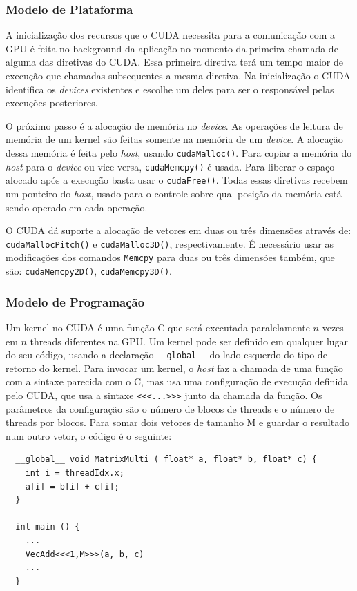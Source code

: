 \subsubsection{Modelo de Plataforma}
A inicialização dos recursos que o CUDA necessita para a comunicação com a GPU é feita no background da
aplicação no momento da primeira chamada de alguma das diretivas do CUDA. Essa primeira diretiva terá um
tempo maior de execução que chamadas subsequentes a mesma diretiva. Na inicialização o CUDA identifica
os \textit{devices} existentes e escolhe um deles para ser o responsável pelas execuções posteriores.

O próximo passo é a alocação de memória no \textit{device}. As operações de leitura de memória de um kernel são feitas somente
na memória de um \textit{device}. A alocação dessa memória é feita pelo \textit{host}, usando \verb#cudaMalloc()#. 
Para copiar a memória do \textit{host} para o \textit{device} ou vice-versa,
\verb#cudaMemcpy()# é usada. Para liberar o espaço alocado após a execução basta usar o \verb#cudaFree()#.
Todas essas diretivas recebem um ponteiro do \textit{host}, usado para o controle sobre qual posição da memória está sendo
operado em cada operação.

O CUDA dá suporte a alocação de vetores em duas ou três dimensões através de: \verb#cudaMallocPitch()# e 
\verb#cudaMalloc3D()#, respectivamente. É necessário usar as modificações dos comandos \verb#Memcpy# para
duas ou três dimensões também, que são: \verb#cudaMemcpy2D()#, \verb#cudaMemcpy3D()#.

\subsubsection{Modelo de Programação}
Um kernel no CUDA é uma função C que será executada paralelamente $n$ vezes em $n$ threads diferentes na GPU. Um kernel pode ser
definido em qualquer lugar do seu código, usando a declaração \verb#__global__# do lado esquerdo do tipo de retorno do kernel.
Para invocar um kernel, o \textit{host} faz a chamada de uma função com a sintaxe parecida com o C, mas usa uma configuração de
execução definida pelo CUDA, que usa a sintaxe \verb#<<<...>>># junto da chamada da função. Os parâmetros da configuração são
o número de blocos de threads e o número de threads por blocos. Para somar dois vetores de tamanho M e guardar o resultado num
outro vetor, o código é o seguinte:

\begin{lstlisting}
  __global__ void MatrixMulti ( float* a, float* b, float* c) { 
    int i = threadIdx.x;
    a[i] = b[i] + c[i];        
  }
                            
  int main () {               
    ...                       
    VecAdd<<<1,M>>>(a, b, c)  
    ...                       
  }                                 
\end{lstlisting}

